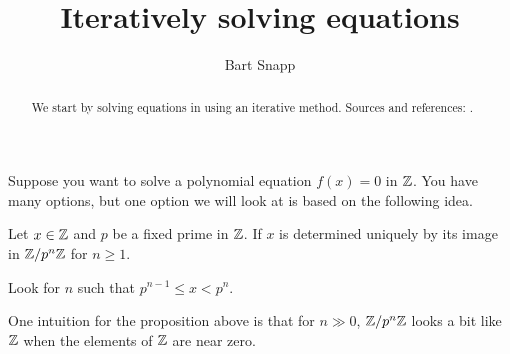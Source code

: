 \documentclass{ximera}
\author{Bart Snapp}
\title{Iteratively solving equations}
\begin{document}
\begin{abstract}
  We start by solving equations in using an iterative method. Sources
  and references: \cite{gB2015}.
\end{abstract}
\maketitle


Suppose you want to solve a polynomial equation $f(x)=0$ in $\mathbb Z$. You
have many options, but one option we will look at is based on the
following idea.


\begin{proposition}
  Let $x\in\mathbb Z$ and $p$ be a fixed prime in $\mathbb Z$. If $x$ is determined
  uniquely by its image in $\mathbb Z/p^n\mathbb Z$ for $n\ge 1$.
  \begin{sketch}
    Look for $n$ such that $p^{n-1}\le x < p^n$.
  \end{sketch}
\end{proposition}

One intuition for the proposition above is that for $n\gg 0$,
$\mathbb Z/p^n\mathbb Z$ looks a bit like $\mathbb Z$ when the elements of $\mathbb Z$ are near
zero.
\end{document}

